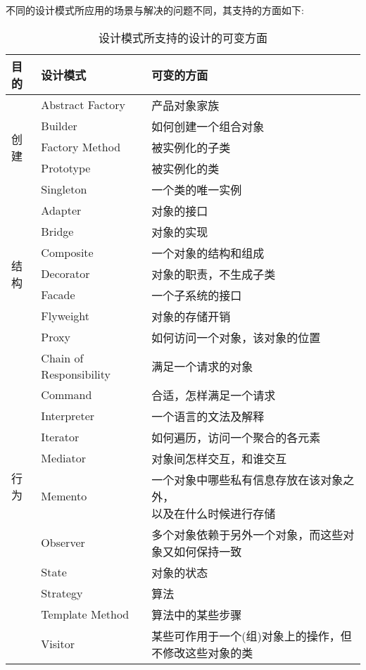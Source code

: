 不同的设计模式所应用的场景与解决的问题不同，其支持的方面如下:
\begin{center}
    \small
    \setlength{\tabcolsep}{3mm}
    \begin{longtable}{l|l|l}
        \caption{设计模式所支持的设计的可变方面} \\
        \toprule
        \textbf{目的} & \textbf{设计模式} & \textbf{可变的方面}\\
        \midrule
        \multirow{5}{*}{创建}& Abstract Factory & 产品对象家族 \\
        & Builder & 如何创建一个组合对象 \\
        & Factory Method & 被实例化的子类 \\
        & Prototype & 被实例化的类 \\
        & Singleton & 一个类的唯一实例 \\
        \midrule
        \multirow{7}{*}{结构} & Adapter & 对象的接口 \\
        & Bridge & 对象的实现 \\
        & Composite & 一个对象的结构和组成\\
        & Decorator & 对象的职责，不生成子类 \\
        & Facade & 一个子系统的接口 \\
        & Flyweight & 对象的存储开销 \\
        & Proxy & 如何访问一个对象，该对象的位置 \\
        \midrule
        \multirow{10}{*}{行为} & Chain of Responsibility & 满足一个请求的对象 \\
        & Command & 合适，怎样满足一个请求 \\
        & Interpreter & 一个语言的文法及解释 \\
        & Iterator & 如何遍历，访问一个聚合的各元素 \\
        & Mediator & 对象间怎样交互，和谁交互 \\
        & Memento & \makecell[l]{一个对象中哪些私有信息存放在该对象之外，\\以及在什么时候进行存储} \\
        & Observer & 多个对象依赖于另外一个对象，而这些对象又如何保持一致 \\
        & State & 对象的状态 \\
        & Strategy & 算法 \\
        & Template Method & 算法中的某些步骤 \\
        & Visitor & 某些可作用于一个(组)对象上的操作，但不修改这些对象的类 \\
        \bottomrule
    \end{longtable}
\end{center}

\newpage